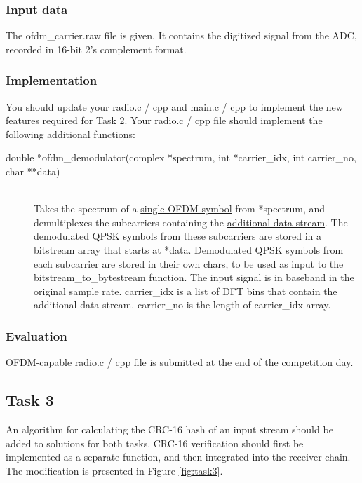 \documentclass[openany]{book}
\begin{document}
	\subsubsection{Input data}
	The \textsf{ofdm\_carrier.raw} file is given. It contains the digitized 
	signal from the ADC, recorded in 16-bit 2's complement format.
	
	\subsubsection{Implementation}
	You should update your \textsf{radio.c / cpp} and \textsf{main.c / cpp} to 
	implement the new features required for Task 2. Your \textsf{radio.c / cpp} 
	file should implement the following additional functions:
	\begin{description}
		\item[double *ofdm\_demodulator(complex *spectrum, int *carrier\_idx, 
		int carrier\_no, char **data)] \leavevmode
		\,\\ Takes the spectrum of a \underline{single OFDM symbol} from 
		\textsf{*spectrum}, and demultiplexes the subcarriers containing the 
		\underline{additional data stream}. The demodulated QPSK symbols from 
		these subcarriers are stored in a bitstream array that starts at 
		\textsf{*data}. Demodulated QPSK symbols from each subcarrier are 
		stored in their own \textsf{char}s, to be used as input to the 
		\textsf{bitstream\_to\_bytestream} function. The input signal is in 
		baseband in the original sample rate. \textsf{carrier\_idx} is a list 
		of DFT bins that contain the additional data stream. 
		\textsf{carrier\_no} is the length of \textsf{carrier\_idx} array.
	\end{description}
	
	\subsubsection{Evaluation}
	
	OFDM-capable \textsf{radio.c / cpp} file is submitted at the end of the 
	competition day.
	
	\subsection{Task 3}
	An algorithm for calculating the CRC-16 hash of an input stream should be 
	added to solutions for both tasks. CRC-16 verification should first be 
	implemented as a separate function, and then integrated into the receiver 
	chain. The modification is presented in Figure \ref{fig:task3}.
	
\end{document}
